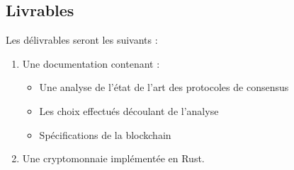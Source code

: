 \subsection*{Livrables}
Les délivrables seront les suivants :
\begin{enumerate}
    \item Une documentation contenant :
    	\begin{itemize}
        	\item Une analyse de l'état de l'art des protocoles de consensus
        	\item Les choix effectués découlant de l'analyse
        	\item Spécifications de la blockchain
    	\end{itemize}
    \item Une cryptomonnaie implémentée en Rust.
\end{enumerate}
